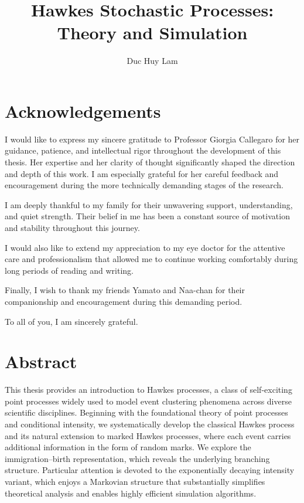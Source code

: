 \documentclass[12pt,a4paper]{report}
\title{Hawkes Stochastic Processes: Theory and Simulation}
\author{Duc Huy Lam}
\date{}
\theoremstyle{plain}
\theoremstyle{definition}
\theoremstyle{remark}
\newcommand{\1}{\mathbf{1}}
\begin{document}
\clearpage
\thispagestyle{empty}
\null
\clearpage

\clearpage
\thispagestyle{empty}
\chapter*{Acknowledgements}

I would like to express my sincere gratitude to Professor Giorgia Callegaro for her guidance, patience, and intellectual rigor throughout the development of this thesis. Her expertise and her clarity of thought significantly shaped the direction and depth of this work. I am especially grateful for her careful feedback and encouragement during the more technically demanding stages of the research.

\medskip
\noindent
I am deeply thankful to my family for their unwavering support, understanding, and quiet strength. Their belief in me has been a constant source of motivation and stability throughout this journey.

\medskip
\noindent
I would also like to extend my appreciation to my eye doctor for the attentive care and professionalism that allowed me to continue working comfortably during long periods of reading and writing.

\medskip
\noindent
Finally, I wish to thank my friends Yamato and Naa-chan for their companionship and encouragement during this demanding period.

\medskip
\noindent
To all of you, I am sincerely grateful.
\clearpage
{}
\setcounter{page}{1}

\chapter*{Abstract}
This thesis provides an introduction to Hawkes processes, a class of self-exciting point processes widely used to model event clustering phenomena across diverse scientific disciplines. Beginning with the foundational theory of point processes and conditional intensity, we systematically develop the classical Hawkes process and its natural extension to marked Hawkes processes, where each event carries additional information in the form of random marks. We explore the immigration--birth representation, which reveals the underlying branching structure. Particular attention is devoted to the exponentially decaying intensity variant, which enjoys a Markovian structure that substantially simplifies theoretical analysis and enables highly efficient simulation algorithms.
\end{document}
